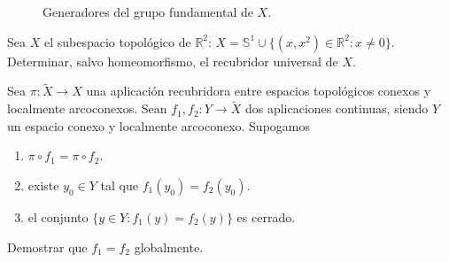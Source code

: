 \documentclass[12pt]{article}
\begin{document}
\begin{ejercicio}[2 puntos]
\begin{figure}[h]
            \caption{Generadores del grupo fundamental de $X$.}
            \label{fig:gen_inicial}
        \end{figure}
    \end{ejercicio}

    \begin{ejercicio}[1.5 puntos]
        Sea $X$ el subespacio topológico de $\mathbb{R}^2$: $X=\mathbb{S}^1\cup \{(x,x^2)\in \mathbb{R}^2 : x\neq 0\}$. Determinar, salvo homeomorfismo, el recubridor universal de $X$.
    \end{ejercicio}

    \begin{ejercicio}[1.5 puntos]
        Sea $\pi:\tilde{X}\to X$ una aplicación recubridora entre espacios topológicos conexos y localmente arcoconexos. Sean $f_1,f_2:Y\to \tilde{X}$ dos aplicaciones continuas, siendo $Y$ un espacio conexo y localmente arcoconexo. Supogamos
        \begin{enumerate}[label=\alph*)]
            \item $\pi\circ f_1 = \pi\circ f_2$.
            \item existe $y_0\in Y$ tal que $f_1(y_0) = f_2(y_0)$.
            \item el conjunto $\{y\in Y:f_1(y)=f_2(y)\}$ es cerrado.
        \end{enumerate}
        Demostrar que $f_1=f_2$ globalmente.
    \end{ejercicio}
\end{document}
